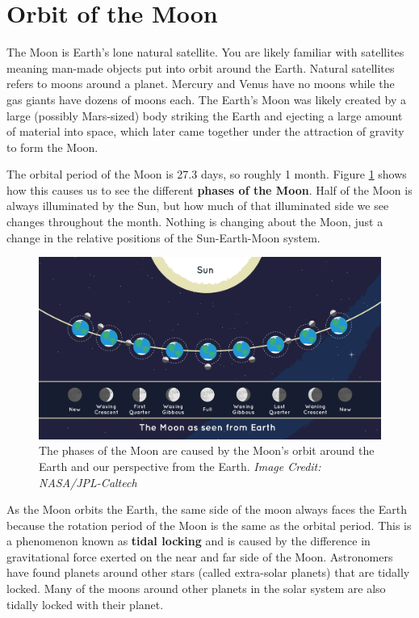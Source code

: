 \documentclass[12pt]{book}
\begin{document}
\section{Orbit of the Moon}

The Moon is Earth's lone natural satellite. You are likely familiar with satellites meaning man-made objects put into orbit around the Earth. Natural satellites refers to moons around a planet. Mercury and Venus have no moons while the gas giants have dozens of moons each. The Earth's Moon was likely created by a large (possibly Mars-sized) body striking the Earth and ejecting a large amount of material into space, which later came together under the attraction of gravity to form the Moon. 

The orbital period of the Moon is 27.3 days, so roughly 1 month. Figure \ref{phases} shows how this causes us to see the different \textbf{phases of the Moon}. Half of the Moon is always illuminated by the Sun, but how much of that illuminated side we see changes throughout the month. Nothing is changing about the Moon, just a change in the relative positions of the Sun-Earth-Moon system.

\begin{figure}[H]
\centering
\includegraphics[scale=0.23]{359_moon-phases-jpl.png}
\caption{The phases of the Moon are caused by the Moon's orbit around the Earth and our perspective from the Earth. \textit{Image Credit: NASA/JPL-Caltech}}
\label{phases}
\end{figure}

As the Moon orbits the Earth, the same side of the moon always faces the Earth because the rotation period of the Moon is the same as the orbital period. This is a phenomenon known as \textbf{tidal locking} and is caused by the difference in gravitational force exerted on the near and far side of the Moon. Astronomers have found planets around other stars (called extra-solar planets) that are tidally locked. Many of the moons around other planets in the solar system are also tidally locked with their planet.
\end{document}
